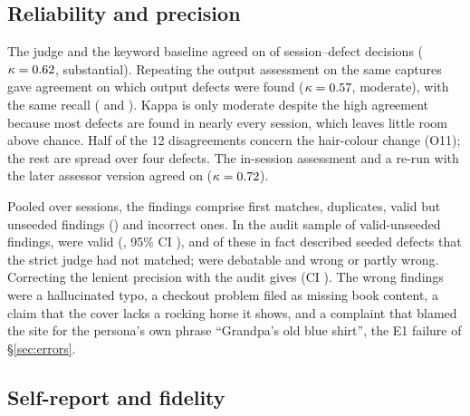 \documentclass[10pt,twocolumn]{article}
\begin{document}
\subsection{Reliability and precision}
\label{sec:reliability}

The judge and the keyword baseline agreed on \AgreeJK{} of session--defect decisions ($\kappa=0.62{}$, substantial). Repeating the output assessment on the same captures gave \RetestAgree{} agreement on which output defects were found ($\kappa=0.57{}$, moderate), with the same recall (\RetestRecallAMean{} and \RetestRecallBMean{}). Kappa is only moderate despite the high agreement because most defects are found in nearly every session, which leaves little room above chance. Half of the 12 disagreements concern the hair-colour change (O11); the rest are spread over four defects. The in-session assessment and a re-run with the later assessor version agreed on \OrigRerunAgree{} ($\kappa=0.72{}$).

Pooled over sessions, the \PooledFindings{} findings comprise \PooledMatched{} first matches, \PooledDuplicate{} duplicates, \PooledUnseeded{} valid but unseeded findings (\UnseededShare{}) and \PooledIncorrect{} incorrect ones. In the audit sample of \AuditN{} valid-unseeded findings, \AuditValid{} were valid (\AuditValidPct{}, 95\% CI \AuditValidCI{}), and \AuditOverlap{} of these in fact described seeded defects that the strict judge had not matched; \AuditDebatable{} were debatable and \AuditWrong{} wrong or partly wrong. Correcting the lenient precision with the audit gives \AdjPLenient{} (CI \AdjPLenientCI{}). The wrong findings were a hallucinated typo, a checkout problem filed as missing book content, a claim that the cover lacks a rocking horse it shows, and a complaint that blamed the site for the persona's own phrase ``Grandpa's old blue shirt'', the E1 failure of \S\ref{sec:errors}.



\subsection{Self-report and fidelity}
\label{sec:selfreport}
\end{document}
